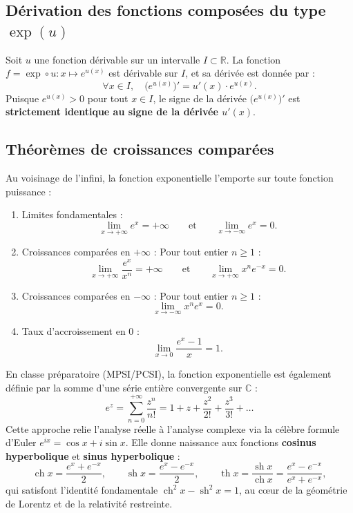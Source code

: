 \documentclass[11pt,a4paper]{article}
\newcommand{\R}{\mathbb{R}}
\newcommand{\C}{\mathbb{C}}
\newcommand{\sh}{\operatorname{sh}}
\newcommand{\ch}{\operatorname{ch}}
\renewcommand{\th}{\operatorname{th}}
\begin{document}
\subsection{Dérivation des fonctions composées du type $\exp(u)$}

\begin{theoremebox}
Soit $u$ une fonction dérivable sur un intervalle $I \subset \R$.
La fonction $f = \exp \circ u : x \mapsto e^{u(x)}$ est dérivable sur $I$, et sa dérivée est donnée par :
\[
\forall x \in I, \quad \bigl(e^{u(x)}\bigr)' = u'(x) \cdot e^{u(x)}.
\]
Puisque $e^{u(x)} > 0$ pour tout $x \in I$, le signe de la dérivée $\bigl(e^{u(x)}\bigr)'$ est \textbf{strictement identique au signe de la dérivée $u'(x)$}.
\end{theoremebox}

\subsection{Théorèmes de croissances comparées}

\begin{theoremebox}
Au voisinage de l'infini, la fonction exponentielle l'emporte sur toute fonction puissance :
\begin{enumerate}
    \item Limites fondamentales :
    \[
    \lim_{x \to +\infty} e^x = +\infty \qquad \text{et} \qquad \lim_{x \to -\infty} e^x = 0.
    \]
    \item Croissances comparées en $+\infty$ : Pour tout entier $n \ge 1$ :
    \[
    \lim_{x \to +\infty} \frac{e^x}{x^n} = +\infty \qquad \text{et} \qquad \lim_{x \to +\infty} x^n e^{-x} = 0.
    \]
    \item Croissances comparées en $-\infty$ : Pour tout entier $n \ge 1$ :
    \[
    \lim_{x \to -\infty} x^n e^x = 0.
    \]
    \item Taux d'accroissement en $0$ :
    \[
    \lim_{x \to 0} \frac{e^x - 1}{x} = 1.
    \]
\end{enumerate}
\end{theoremebox}

\begin{remarquebox}
En classe préparatoire (MPSI/PCSI), la fonction exponentielle est également définie par la somme d'une série entière convergente sur $\C$ :
\[
e^z = \sum_{n=0}^{+\infty} \frac{z^n}{n!} = 1 + z + \frac{z^2}{2!} + \frac{z^3}{3!} + \dots
\]
Cette approche relie l'analyse réelle à l'analyse complexe via la célèbre formule d'Euler $e^{ix} = \cos x + i \sin x$.
Elle donne naissance aux fonctions \textbf{cosinus hyperbolique} et \textbf{sinus hyperbolique} :
\[
\ch x = \frac{e^x + e^{-x}}{2}, \qquad \sh x = \frac{e^x - e^{-x}}{2}, \qquad \th x = \frac{\sh x}{\ch x} = \frac{e^x - e^{-x}}{e^x + e^{-x}},
\]
qui satisfont l'identité fondamentale $\ch^2 x - \sh^2 x = 1$, au cœur de la géométrie de Lorentz et de la relativité restreinte.
\end{remarquebox}
\end{document}
